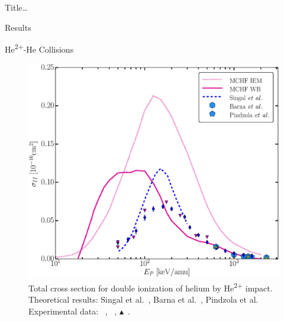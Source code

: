 \documentclass[letterpaper, 11 pt]{report}
\begin{document}
\begin{chapter}{ Title\dots \label{chap:p-he2p-he}}
\begin{section}{Results \label{sec:phe2p-res}}
\begin{subsection}{\texorpdfstring{He\textsuperscript{2+}}{He2+}-He Collisions 
                         \label{sec:he2phe-res}}
\begin{figure}[ht]
\begin{minipage}{.49\linewidth}
               \centering
               \includegraphics[width = \linewidth]{./images/he2phe/he2phe-II.eps}
               \caption[Total cross section for double ionization of helium by He\textsuperscript{2+}
                        impact.]{Total cross section for double ionization of helium by
                        He\textsuperscript{2+} impact. Theoretical results: Singal
                        et al.~\cite{SL-91}, Barna
                        et al.~\cite{BTB-05}, Pindzola et al.~\cite{PRC-07}
                        Experimental data: {\color{blue}{$\blacklozenge$}}~\cite{SG85},
                        {\color{RedViolet}{$\blacktriangledown$}}~\cite{Dubois87},
                        {\color{GreenYellow}$\blacktriangle$}~\cite{KAH84}. \label{fig:he2phe-ii}}
            \end{minipage}
         \end{figure}

         \begin{figure}[ht]
            \begin{minipage}{.49\linewidth}
               

\end{minipage}
\end{figure}
\end{subsection}
\end{section}
\end{chapter}
\end{document}
